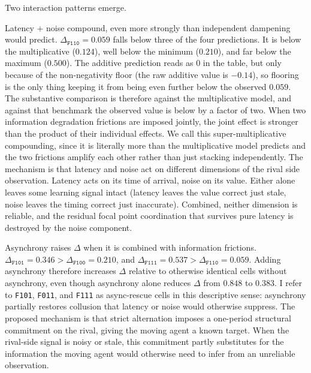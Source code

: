 Two interaction patterns emerge.

Latency $+$ noise compound, even more strongly than independent dampening would predict. $\Delta_{\texttt{F110}} = 0.059$ falls below three of the four predictions. It is below the multiplicative ($0.124$), well below the minimum ($0.210$), and far below the maximum ($0.500$). The additive prediction reads as $0$ in the table, but only because of the non-negativity floor (the raw additive value is $-0.14$), so flooring is the only thing keeping it from being even further below the observed $0.059$. The substantive comparison is therefore against the multiplicative model, and against that benchmark the observed value is below by a factor of two. When two information degradation frictions are imposed jointly, the joint effect is stronger than the product of their individual effects. We call this super-multiplicative compounding, since it is literally more than the multiplicative model predicts and the two frictions amplify each other rather than just stacking independently. The mechanism is that latency and noise act on different dimensions of the rival side observation. Latency acts on its time of arrival, noise on its value. Either alone leaves some learning signal intact (latency leaves the value correct just stale, noise leaves the timing correct just inaccurate). Combined, neither dimension is reliable, and the residual focal point coordination that survives pure latency is destroyed by the noise component.

\medskip

Asynchrony raises $\Delta$ when it is combined with information frictions. $\Delta_{\texttt{F101}} = 0.346 > \Delta_{\texttt{F100}} = 0.210$, and $\Delta_{\texttt{F111}} = 0.537 > \Delta_{\texttt{F110}} = 0.059$. Adding asynchrony therefore increases $\Delta$ relative to otherwise identical cells without asynchrony, even though asynchrony alone reduces $\Delta$ from $0.848$ to $0.383$. I refer to \texttt{F101}, \texttt{F011}, and \texttt{F111} as async-rescue cells in this descriptive sense: asynchrony partially restores collusion that latency or noise would otherwise suppress. The proposed mechanism is that strict alternation imposes a one-period structural commitment on the rival, giving the moving agent a known target. When the rival-side signal is noisy or stale, this commitment partly substitutes for the information the moving agent would otherwise need to infer from an unreliable observation.

\medskip

